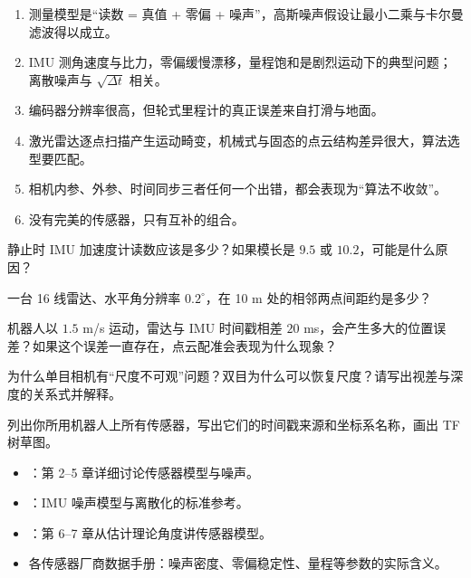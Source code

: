 \begin{summary}

\begin{enumerate}
  \item 测量模型是“读数 = 真值 + 零偏 + 噪声”，高斯噪声假设让最小二乘与卡尔曼滤波得以成立。
  \item IMU 测角速度与比力，零偏缓慢漂移，量程饱和是剧烈运动下的典型问题；离散噪声与 $\sqrt{\Delta t}$ 相关。
  \item 编码器分辨率很高，但轮式里程计的真正误差来自打滑与地面。
  \item 激光雷达逐点扫描产生运动畸变，机械式与固态的点云结构差异很大，算法选型要匹配。
  \item 相机内参、外参、时间同步三者任何一个出错，都会表现为“算法不收敛”。
  \item 没有完美的传感器，只有互补的组合。
\end{enumerate}

\end{summary}

\begin{problemset}

  \item 静止时 IMU 加速度计读数应该是多少？如果模长是 $9.5$ 或 $10.2$，可能是什么原因？
  \item 一台 16 线雷达、水平角分辨率 $0.2^\circ$，在 10 m 处的相邻两点间距约是多少？
  \item 机器人以 $1.5$ m/s 运动，雷达与 IMU 时间戳相差 $20$ ms，会产生多大的位置误差？如果这个误差一直存在，点云配准会表现为什么现象？
  \item 为什么单目相机有“尺度不可观”问题？双目为什么可以恢复尺度？请写出视差与深度的关系式并解释。
  \item 列出你所用机器人上所有传感器，写出它们的时间戳来源和坐标系名称，画出 TF 树草图。
\end{problemset}

\begin{reading}

\begin{itemize}
  \item \cite{thrun2005probabilistic}：第 2--5 章详细讨论传感器模型与噪声。
  \item \cite{sola2017eskf}：IMU 噪声模型与离散化的标准参考。
  \item \cite{barfoot2017state}：第 6--7 章从估计理论角度讲传感器模型。
  \item 各传感器厂商数据手册：噪声密度、零偏稳定性、量程等参数的实际含义。
\end{itemize}


\end{reading}


